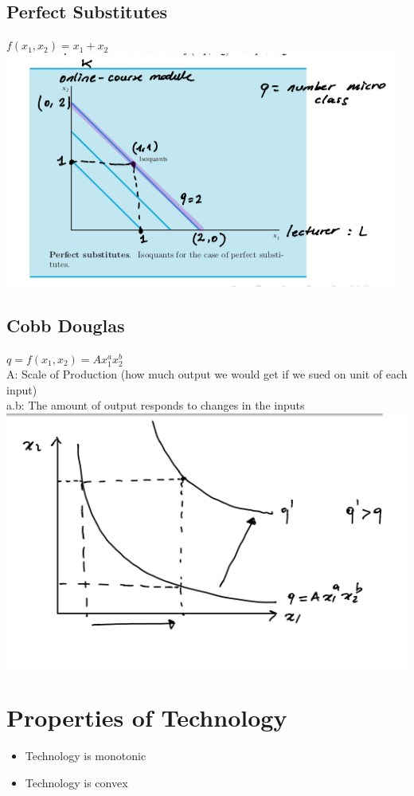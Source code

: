\documentclass{report}
\begin{document}
\subsection{Perfect Substitutes}
$f(x_1,x_2) = x_1+x_2$\\
\includegraphics[width = \textwidth]{econ4}
\subsection{Cobb Douglas}
$q=f(x_1,x_2)=Ax_1^ax_2^b$\\A: Scale of Production (how much output we would get if we sued on unit of each input)\\a.b: The amount of output responds to changes in the inputs\\
\includegraphics[width = \textwidth]{econ5}
\section{Properties of Technology}
\begin{defbox}
\begin{itemize}
\item Technology is monotonic
\item Technology is convex
\end{itemize}
\end{defbox}
\end{document}
